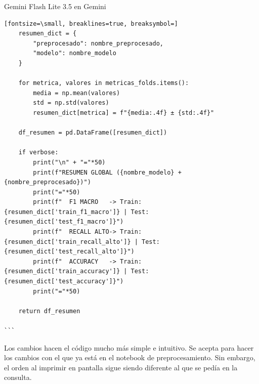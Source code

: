 \documentclass[12pt,a4paper,oneside]{book}
\begin{document}
\begin{iaresp}{Gemini Flash Lite 3.5 en Gemini}
\begin{Verbatim}[fontsize=\small, breaklines=true, breaksymbol=]
    resumen_dict = {
        "preprocesado": nombre_preprocesado,
        "modelo": nombre_modelo
    }
    
    for metrica, valores in metricas_folds.items():
        media = np.mean(valores)
        std = np.std(valores)
        resumen_dict[metrica] = f"{media:.4f} ± {std:.4f}"

    df_resumen = pd.DataFrame([resumen_dict])
    
    if verbose:
        print("\n" + "="*50)
        print(f"RESUMEN GLOBAL ({nombre_modelo} + {nombre_preprocesado})")
        print("="*50)
        print(f"  F1 MACRO   -> Train: {resumen_dict['train_f1_macro']} | Test: {resumen_dict['test_f1_macro']}")
        print(f"  RECALL ALTO-> Train: {resumen_dict['train_recall_alto']} | Test: {resumen_dict['test_recall_alto']}")
        print(f"  ACCURACY   -> Train: {resumen_dict['train_accuracy']} | Test: {resumen_dict['test_accuracy']}")
        print("="*50)
        
    return df_resumen

```
\end{Verbatim}
\end{iaresp}
\begin{iaanalisis}
Los cambios hacen el código mucho más simple e intuitivo. Se acepta para hacer los cambios con el que ya está en el notebook de preprocesamiento. Sin embargo, el orden al imprimir en pantalla sigue siendo diferente al que se pedía en la consulta.
\end{iaanalisis}
\end{document}
